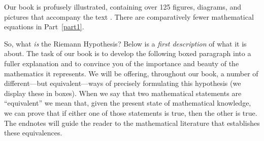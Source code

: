 \documentclass[openany]{book}
\theoremstyle{plain}
\theoremstyle{definition}
\begin{document}
Our book is profusely illustrated, containing over 125 figures,
diagrams, and pictures that accompany the text .
There are comparatively fewer
mathematical equations in Part~\ref{part1}.   
 
So, what {\it is} the Riemann Hypothesis?  Below is a {\it first
  description} of what it is about. The task of our book is to develop
the following boxed paragraph into a fuller explanation and to
convince you of the importance and beauty of the mathematics it
represents.  We will be offering, throughout our book, a number of
different---but equivalent---ways of precisely formulating this
hypothesis (we display these in boxes).  When we say that two
mathematical statements are ``equivalent'' we mean that, given the
present state of mathematical knowledge, we can prove that if either
one of those statements is true, then the other is true. The endnotes
will guide the reader to the mathematical literature that establishes
these equivalences.
      
\end{document}

